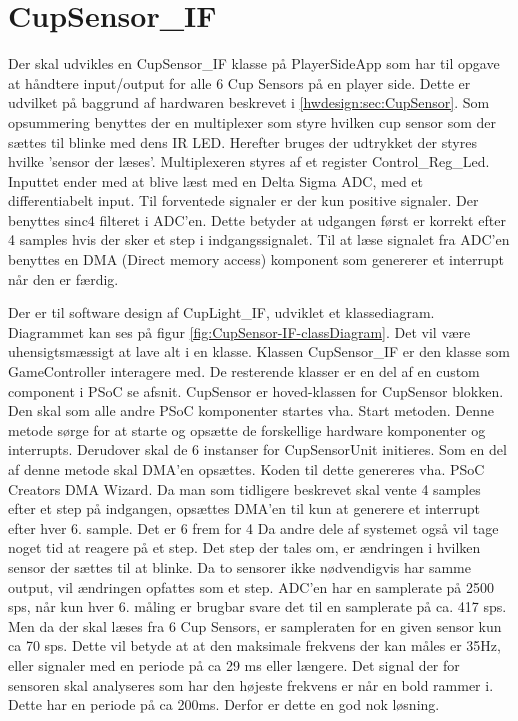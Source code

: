 \documentclass[Softwaredesign/Softwaredesign_main.tex]{subfiles}
\begin{document}
\section{CupSensor\_IF}
Der skal udvikles en CupSensor\_IF klasse på PlayerSideApp som har til opgave at håndtere input/output for alle 6 Cup Sensors på en player side. Dette er udvilket på baggrund af hardwaren beskrevet i \ref{hwdesign:sec:CupSensor}. Som opsummering benyttes der en multiplexer som styre hvilken cup sensor som der sættes til blinke med dens IR LED. Herefter bruges der udtrykket der styres hvilke 'sensor der læses'. Multiplexeren styres af et register Control\_Reg\_Led. Inputtet ender med at blive læst med en Delta Sigma ADC, med et differentiabelt input. Til forventede signaler er der kun positive signaler. Der benyttes sinc4 filteret i ADC'en. Dette betyder at udgangen først er korrekt efter 4 samples hvis der sker et step i indgangssignalet. Til at læse signalet fra ADC'en benyttes en DMA (Direct memory access) komponent som genererer et interrupt når den er færdig.

Der er til software design af CupLight\_IF, udviklet et klassediagram. Diagrammet kan ses på figur \ref{fig:CupSensor-IF-classDiagram}. Det vil være uhensigtsmæssigt at lave alt i en klasse. Klassen CupSensor\_IF er den klasse som GameController interagere med. De resterende klasser er en del af en custom component i PSoC se afsnit.  CupSensor er hoved-klassen for CupSensor blokken. Den skal som alle andre PSoC komponenter startes vha. Start metoden. Denne metode sørge for at starte og opsætte de forskellige hardware komponenter og interrupts. Derudover skal de 6 instanser for CupSensorUnit initieres. Som en del af denne metode skal DMA'en opsættes. Koden til dette genereres vha. PSoC Creators DMA Wizard. Da man som tidligere beskrevet skal vente 4 samples efter et step på indgangen, opsættes DMA'en til kun at generere et interrupt efter hver 6. sample. Det er 6 frem for 4 Da andre dele af systemet også vil tage noget tid at reagere på et step. Det step der tales om, er ændringen i hvilken sensor der sættes til at blinke. Da to sensorer ikke nødvendigvis har samme output, vil ændringen opfattes som et step. ADC'en har en samplerate på 2500 sps, når kun hver 6. måling er brugbar svare det til en samplerate på ca. 417 sps. Men da der skal læses fra 6 Cup Sensors, er sampleraten for en given sensor kun ca 70 sps. Dette vil betyde at at den maksimale frekvens der kan måles er 35Hz, eller signaler med en periode på ca 29 ms eller længere. Det signal der for sensoren skal analyseres som har den højeste frekvens er når en bold rammer i. Dette har en periode på ca 200ms. Derfor er dette en god nok løsning.
\end{document}
